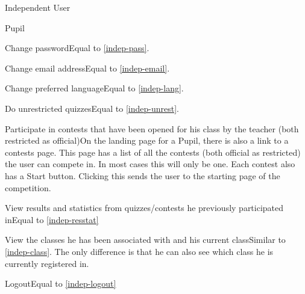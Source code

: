 \begin{section}{Independent User}
    \end{section}
    

\begin{section}{Pupil}

    \begin{subsection}{Change password}Equal to \ref{indep-pass}.\end{subsection}
    \begin{subsection}{Change email address}Equal to \ref{indep-email}.\end{subsection}
    \begin{subsection}{Change preferred language}Equal to \ref{indep-lang}.\end{subsection}
    \begin{subsection}{Do unrestricted quizzes}Equal to \ref{indep-unrest}.\end{subsection}
    \begin{subsection}{Participate in contests that have been opened for his class by the teacher (both restricted as official)}On the landing page for a Pupil, there is also a link to a contests page. This page has a list of all the contests (both official as restricted) the user can compete in. In most cases this will only be one. Each contest also has a Start button. Clicking this sends the user to the starting page of the competition.\end{subsection}
    \begin{subsection}{View results and statistics from quizzes/contests he previously participated in}Equal to \ref{indep-resstat}\end{subsection}
    \begin{subsection}{View the classes he has been associated with and his current class}Similar to \ref{indep-class}. The only difference is that he can also see which class he is currently registered in.\end{subsection}
	\begin{subsection}{Logout}Equal to \ref{indep-logout}\end{subsection}

\end{section}
